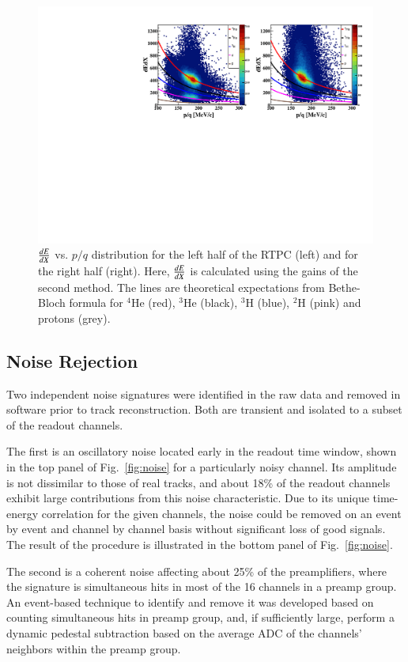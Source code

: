 \documentclass[preprint,5p]{elsarticle}
\begin{document}
\begin{figure}[tb]
\centering
\includegraphics[scale=0.73]{fig_2017/f_dedx_p_exp_2nd.pdf}
\caption{$\small{\frac{dE}{dX}}$ vs. $p/q$ distribution for the left half of 
   the RTPC (left) and for the right half (right). Here, 
   $\small{\frac{dE}{dX}}$ is calculated using the gains of the second method.  
   The lines are theoretical expectations from Bethe-Bloch formula for $^4$He 
   (red), $^3$He (black), $^3$H (blue), $^2$H (pink) and protons (grey).}
\label{fig:dedx_p_exp_2nd}
\end{figure}

\subsection{Noise Rejection}
Two independent noise signatures were identified in the raw data and removed in software prior to track reconstruction.  Both are transient and isolated to a subset of the readout channels. 

The first is an oscillatory noise located early in the readout time window, 
shown in the top panel of Fig.~\ref{fig:noise} for a particularly noisy 
channel. Its amplitude is not dissimilar to those of real tracks, and about 
18\% of the readout channels exhibit large contributions from this noise 
characteristic. Due to its unique time-energy correlation for the given 
channels, the noise could be removed on an event by event and channel by 
channel basis without significant loss of good signals. The result of the
procedure is illustrated in the bottom panel of Fig.~\ref{fig:noise}.

The second is a coherent noise affecting about 25\% of the preamplifiers, where 
the signature is simultaneous hits in most of the 16 channels in a preamp 
group.   An event-based technique to identify and remove it was developed based 
on counting simultaneous hits in preamp group, and, if sufficiently large, 
perform a dynamic pedestal subtraction based on the average ADC of the 
channels' neighbors within the preamp group.
\end{document}
